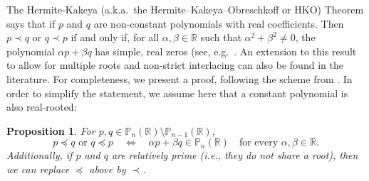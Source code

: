 \documentclass[reqno,11pt]{amsart}
\newtheorem{proposition}[theorem]{Proposition}
\theoremstyle{remark}
\newcommand{\pp}{\mathbb{P}}
\newcommand{\rr}{\mathbb{R}}
\begin{document}
The Hermite-Kakeya (a.k.a.~the Hermite–Kakeya–Obreschkoff or HKO) Theorem says that if $p$ and $q$ are non-constant polynomials with real coefficients. Then $p \prec q$ or $q\prec p$ if and only if, for all $\alpha, \beta \in \mathbb{R}$ such that $\alpha^2+\beta^2 \neq 0$, the polynomial $ \alpha p +\beta q $ has simple, real zeros (see, e.g.~\cite[Theorem 6.3.8]{MR1954841}. An extension to this result to allow for multiple roots and non-strict interlacing can also be found in the literature. For completeness, we present a proof, following the scheme from \cite{MR1179101,MR1268783}. 
In order to simplify the statement, we assume here that a constant polynomial is also real-rooted:
\begin{proposition} 
\label{lem:interlacing}
For $p, q\in \pp_n(\rr)\setminus \pp_{n-1}(\rr)$,  
$$
p \preccurlyeq q \text{ or } q \preccurlyeq p \quad \Leftrightarrow \quad \alpha p+\beta q\in \pp_n(\rr)  \quad \text{for every } \alpha,\beta\in \rr.
$$
Additionally, if $p$ and $q$ are relatively prime (i.e., they do not share a root), then we can replace $\preccurlyeq$ above by $\prec$.
\end{proposition}
\end{document}

